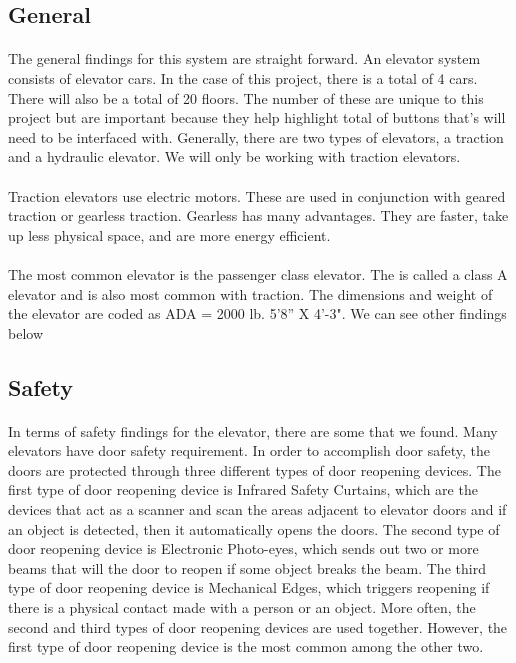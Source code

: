 \documentclass[12pt]{article}
\begin{document}
\subsection{General}
\paragraph{} The general findings for this system are straight forward. An elevator system consists of elevator cars. In the case of this project, there is a total of 4 cars. There will also be a total of 20 floors. The number of these are unique to this project but are important because they help highlight total of buttons that’s will need to be interfaced with. Generally, there are two types of elevators, a traction and a hydraulic elevator. We will only be working with traction elevators.
\paragraph{} Traction elevators use electric motors. These are used in conjunction with geared traction or gearless traction. Gearless has many advantages. They are faster, take up less physical space, and are more energy efficient.
\paragraph{} The most common elevator is the passenger class elevator. The is called a class A elevator and is also most common with traction. The dimensions and weight of the elevator are coded as ADA = 2000 lb. 5’8” X 4’-3". We can see other findings below
\subsection{Safety}
\paragraph{} In terms of safety findings for the elevator, there are some that we found. Many elevators have door safety requirement. In order to accomplish door safety, the doors are protected through three different types of door reopening devices. The first type of door reopening device is Infrared Safety Curtains, which are the devices that act as a scanner and scan the areas adjacent to elevator doors and if an object is detected, then it automatically opens the doors. The second type of door reopening device is Electronic Photo-eyes, which sends out two or more beams that will the door to reopen if some object breaks the beam. The third type of door reopening device is Mechanical Edges, which triggers reopening if there is a physical contact made with a person or an object. More often, the second and third types of door reopening devices are used together. However, the first type of door reopening device is the most common among the other two.
\end{document}
